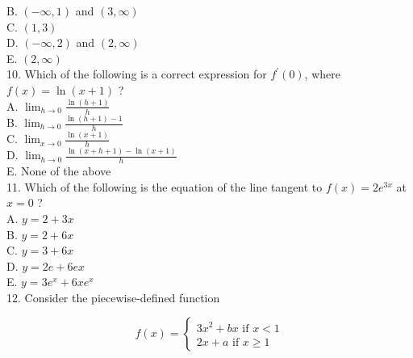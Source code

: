 B. $(-\infty, 1)$ and $(3, \infty)$\\
C. $(1,3)$\\
D. $(-\infty, 2)$ and $(2, \infty)$\\
E. $(2, \infty)$\\
10. Which of the following is a correct expression for $f^{\prime}(0)$, where $f(x)=\ln (x+1)$ ?\\
A. $\lim _{h \rightarrow 0} \frac{\ln (h+1)}{h}$\\
B. $\lim _{h \rightarrow 0} \frac{\ln (h+1)-1}{h}$\\
C. $\lim _{x \rightarrow 0} \frac{\ln (x+1)}{h}$\\
D. $\lim _{h \rightarrow 0} \frac{\ln (x+h+1)-\ln (x+1)}{h}$\\
E. None of the above\\
11. Which of the following is the equation of the line tangent to $f(x)=2 e^{3 x}$ at $x=0$ ?\\
A. $y=2+3 x$\\
B. $y=2+6 x$\\
C. $y=3+6 x$\\
D. $y=2 e+6 e x$\\
E. $y=3 e^{x}+6 x e^{x}$\\
12. Consider the piecewise-defined function

$$
f(x)=\left\{\begin{array}{l}
3 x^{2}+b x \text { if } x<1 \\
2 x+a \text { if } x \geq 1
\end{array}\right.
$$

